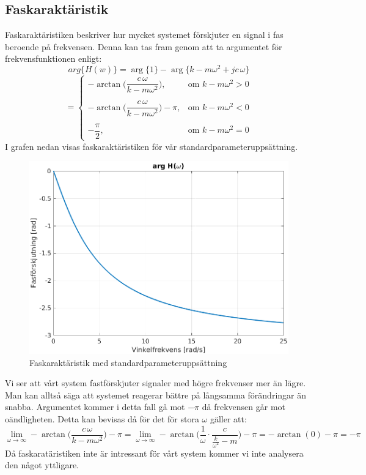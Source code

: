 \subsection{Faskaraktäristik}
Faskaraktäristiken beskriver hur mycket systemet förskjuter en signal i fas beroende på frekvensen. Denna kan tas fram genom att ta argumentet för frekvensfunktionen enligt:
$$arg\big\{H(w)\big\}=\arg\big\{1\big\}-\arg\big\{k-m\omega^2+jc\,\omega\big\}$$
$$=\begin{cases}
-\arctan\bigg(\dfrac{c\,\omega}{k-m\omega^2}\bigg), & \text{om } k-m\omega^2 > 0  \\\\
-\arctan\bigg(\dfrac{c\,\omega}{k-m\omega^2}\bigg)-\pi, & \text{om } k-m\omega^2 < 0 \\\\ 
-\dfrac{\pi}{2}, & \text{om } k-m\omega^2 = 0 
\end{cases}$$
I grafen nedan visas faskaraktäristiken för vår standardparameteruppsättning.
\begin{figure}[H]
    \centering
    \includegraphics[scale=0.75]{bilder/faskaraktaristik}
    \caption{Faskaraktäristik med standardparameteruppsättning}
    \label{fig:faskaraktaristik}
\end{figure}
Vi ser att vårt system fastförskjuter signaler med högre frekvenser mer än lägre. Man kan alltså säga att systemet reagerar bättre på långsamma förändringar än snabba.
Argumentet kommer i detta fall gå mot $-\pi$ då frekvensen går mot oändligheten. Detta kan bevisas då för det för stora $\omega$  gäller att:
$$\lim_{\omega\to\infty}-\arctan\bigg(\dfrac{c\,\omega}{k-m\omega^2}\bigg)-\pi=
\lim_{\omega\to\infty}-\arctan\Bigg(\dfrac{1}{\omega}\cdot\frac{c}{\frac{k}{\omega^2}-m}\Bigg)-\pi=-\arctan(0)-\pi=-\pi$$
Då faskaratäristiken inte är intressant för vårt system kommer vi inte analysera den något yttligare.
\newpage
